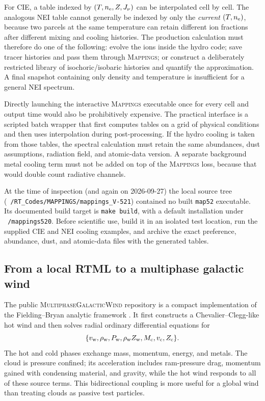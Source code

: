 \documentclass[english,a4paper]{my_memo2}
\newcommand{\nelec}{n_{\rm e}}
\begin{document}
For CIE, a table indexed by $(T,\nelec,Z,J_\nu)$ can be interpolated cell by
cell.  The analogous NEI table cannot generally be indexed by only the
\emph{current} $(T,\nelec)$, because two parcels at the same temperature can
retain different ion fractions after different mixing and cooling histories.
The production calculation must therefore do one of the following: evolve
the ions inside the hydro code; save tracer histories and pass them through
\textsc{Mappings}; or construct a deliberately restricted library of
isochoric/isobaric histories and quantify the approximation.  A final
snapshot containing only density and temperature is insufficient for a
general NEI spectrum.

Directly launching the interactive \textsc{Mappings} executable once for
every cell and output time would also be prohibitively expensive.  The
practical interface is a scripted batch wrapper that first computes tables
on a grid of physical conditions and then uses interpolation during
post-processing.  If the hydro cooling is taken from those tables, the
spectral calculation must retain the same abundances, dust assumptions,
radiation field, and atomic-data version.  A separate background metal
cooling term must not be added on top of the \textsc{Mappings} loss, because
that would double count radiative channels.

At the time of inspection (and again on 2026-09-27) the local source tree
(\texttt{\string~/RT\_Codes/MAPPINGS/mappings\_V-521}) contained no built
\texttt{map52} executable.  Its documented build target is
\texttt{make build}, with a default installation under
\texttt{\string~/mappings520}.  Before scientific use, build it in an
isolated test location, run the supplied CIE and NEI cooling examples, and
archive the exact preference, abundance, dust, and atomic-data files with
the generated tables.

\subsection{From a local RTML to a multiphase galactic wind}
\label{sec:fieldingbryan}

The public \textsc{MultiphaseGalacticWind} repository is a compact
implementation of the Fielding--Bryan analytic framework
\cite{FieldingBryan2022}.  It first constructs a Chevalier--Clegg-like hot
wind and then solves radial ordinary differential equations for
\[
 \{v_{\rm w},\rho_{\rm w},P_{\rm w},\rho_{\rm w}Z_{\rm w},
   M_{\rm c},v_{\rm c},Z_{\rm c}\}.
\]
The hot and cold phases exchange mass, momentum, energy, and metals.  The
cloud is pressure confined; its acceleration includes ram-pressure drag,
momentum gained with condensing material, and gravity, while the hot wind
responds to all of these source terms.  This bidirectional coupling is more
useful for a global wind than treating clouds as passive test particles.
\end{document}
